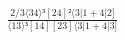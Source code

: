 \documentclass[varwidth, border=5pt]{standalone}
\begin{document}
\begin{my}
$\begin{gathered}
\scriptscriptstyle\frac{2/3⟨34⟩³[24]²⟨3|1+4|2]}{⟨13⟩³[14][23]⟨3|1+4|3]}
\end{gathered}$
\end{my}
\end{document}
